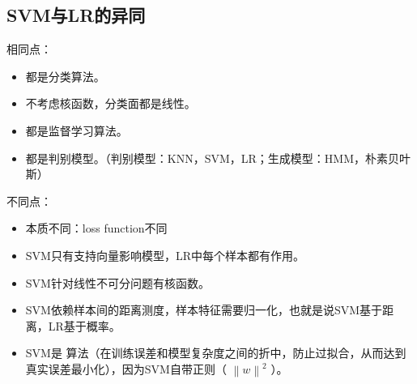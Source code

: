 \documentclass[letterpaper,10pt,english]{sphinxmanual}
\begin{document}
\subsection{SVM与LR的异同}
\label{\detokenize{machineLearning/02_svm:svmlr}}
相同点：
\begin{itemize}
\item {} 
都是分类算法。

\item {} 
不考虑核函数，分类面都是线性。

\item {} 
都是监督学习算法。

\item {} 
都是判别模型。（判别模型：KNN，SVM，LR；生成模型：HMM，朴素贝叶斯）

\end{itemize}

不同点：
\begin{itemize}
\item {} 
本质不同：loss function不同

\item {} 
SVM只有支持向量影响模型，LR中每个样本都有作用。

\item {} 
SVM针对线性不可分问题有核函数。

\item {} 
SVM依赖样本间的距离测度，样本特征需要归一化，也就是说SVM基于距离，LR基于概率。

\item {} 
SVM是  算法（在训练误差和模型复杂度之间的折中，防止过拟合，从而达到真实误差最小化），因为SVM自带正则（ \(\left \| w \right \|^2\) ）。

\end{itemize}
\end{document}
